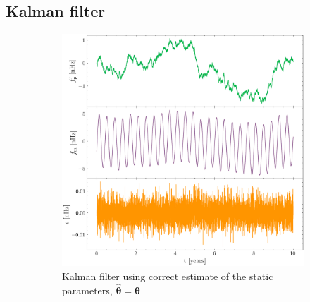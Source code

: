 \documentclass[fleqn,usenatbib,useAMS]{mnras}
\begin{document}
\subsection{Kalman filter}\label{sec:kalman_filter}









%
%	
%


\begin{figure}
	\begin{subfigure}[b]{0.49\textwidth}
		\includegraphics[width=\textwidth]{images/Kalman_example_true_params_single}
		\caption{Kalman filter using correct estimate of the static parameters, $\hat{\boldsymbol{\theta}} = \boldsymbol{\theta}$ }
		\label{fig:6MB_BFS}
	\end{subfigure}  
    \hfill
	\begin{subfigure}[b]{0.49\textwidth}

\end{subfigure}
\end{figure}
\end{document}
